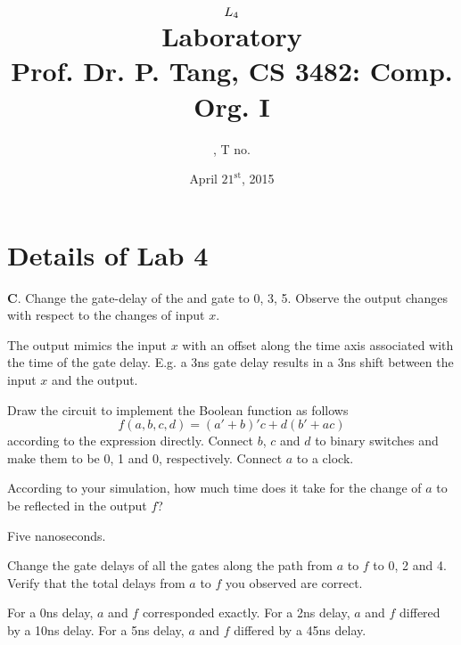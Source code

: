 \documentclass[11pt]{article}
\title{
	$L_{4}$ \\
	{\large Laboratory \rom{\lab}} \\
	{\normalsize Prof. Dr. P. Tang, CS 3482: Comp. Org. I}
}
\author{
	\name, T no. \tno
}
\date{April $21^{\text{st}}$, 2015}
\begin{document}
\maketitle

\section{Details of Lab 4}

\begin{question}
	{\bf C}. Change the gate-delay of the {\sc and} gate to 0, 3, 5. Observe the output
	changes with respect to the changes of input $x$.

	The output mimics the input $x$ with an offset along the time axis associated with the time
	of the gate delay. E.g. a 3ns gate delay results in a 3ns shift between the input $x$ and the
	output.
\end{question}

\begin{question}
	Draw the circuit to implement the Boolean function as follows
	\begin{equation}
		\label{eq:booleanexpression}
		f(a,b,c,d) = (a' + b)'c + d(b' + ac)
	\end{equation}
	according to the expression directly.
	Connect $b$, $c$ and $d$ to binary switches and make them to be 0, 1 and 0, respectively.
	Connect $a$ to a clock.

	\begin{subquestion}
		According to your simulation, how much time does it take for the change of $a$ to be
		reflected in the output $f$?

		Five nanoseconds.
	\end{subquestion}

	\begin{subquestion}
		Change the gate delays of all the gates along the path from $a$ to $f$ to 0, 2 and 4.
		Verify that the total delays from $a$ to $f$ you observed are correct.

		For a 0ns delay, $a$ and $f$ corresponded exactly. For a 2ns delay, $a$ and $f$ differed by a 10ns delay.
		For a 5ns delay, $a$ and $f$ differed by a 45ns delay.
	\end{subquestion}


\end{question}
\end{document}
